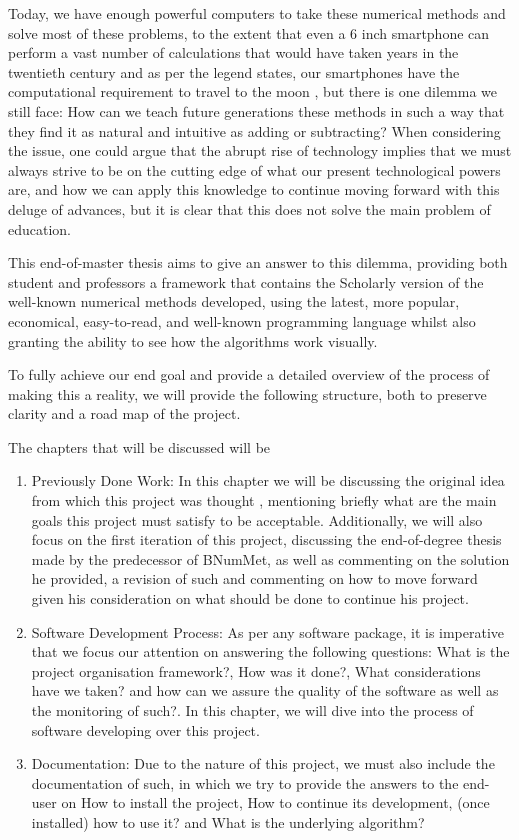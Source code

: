 Today, we have enough powerful computers to take these numerical methods and solve most of these problems, to the extent that even a 6 inch smartphone can perform a vast number of calculations that would have taken years in the twentieth century and as per the legend states, our smartphones have the computational requirement to travel to the moon , but there is one dilemma we still face: How can we teach future generations these methods in such a way that they find it as natural and intuitive as adding or subtracting? When considering the issue, one could argue that the abrupt rise of technology implies that we must always strive to be on the cutting edge of what our present technological powers are, and how we can apply this knowledge to continue moving forward with this deluge of advances,  but it is clear that this does not solve the main problem of education.


This end-of-master thesis aims to give an answer to this dilemma, providing both student and professors a framework that contains the Scholarly version of the well-known numerical methods developed, using the latest, more popular, economical, easy-to-read, and well-known programming language whilst also granting the ability to see how the algorithms work visually.  

To fully achieve our end goal and provide a detailed overview of the process of making this a reality, we will provide the following structure, both to preserve clarity and a road map of the project. 

The chapters that will be discussed will be
\begin{enumerate}
    \item Previously Done Work:
        In this chapter we will be discussing the original idea from which this project was thought , mentioning briefly what are the main goals this project must satisfy to be acceptable. Additionally, we will also focus on the first iteration of this project, discussing the end-of-degree thesis made by the predecessor of BNumMet, as well as commenting on the solution he provided, a revision of such and commenting on how to move forward given his consideration on what should be done to continue his project.    
    \item Software Development Process:
    As per any software package, it is imperative that we focus our attention on answering the following questions: What is the project organisation framework?, How was it done?, What considerations have we taken? and how can we assure the quality of the software as well as the monitoring of such?. In this chapter, we will dive into the process of software developing over this project. 
    
    \item Documentation:
    Due to the nature of this project, we must also include the documentation of such, in which we try to provide the answers to the end-user on How to install the project, How to continue its development, (once installed) how to use it? and What is the underlying algorithm?
\end{enumerate}